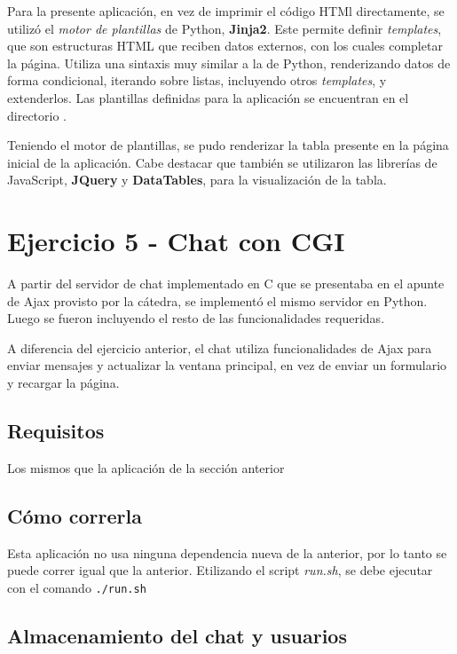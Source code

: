 Para la presente aplicación, en vez de imprimir el código HTMl directamente, se utilizó el \emph{motor de plantillas} de Python, \textbf{Jinja2}. Este permite definir \emph{templates}, que son estructuras HTML que reciben datos externos, con los cuales completar la página. Utiliza una sintaxis muy similar a la de Python, renderizando datos de forma condicional, iterando sobre listas, incluyendo otros \emph{templates}, y extenderlos. Las plantillas definidas para la aplicación se encuentran en el directorio .

Teniendo el motor de plantillas, se pudo renderizar la tabla presente en la página inicial de la aplicación. Cabe destacar que también se utilizaron las librerías de JavaScript, \textbf{JQuery} y \textbf{DataTables}, para la visualización de la tabla.  

\section{Ejercicio 5 - Chat con CGI}

A partir del servidor de chat implementado en C que se presentaba en el apunte de Ajax provisto por la cátedra, se implementó el mismo servidor en Python. Luego se fueron incluyendo el resto de las funcionalidades requeridas.

A diferencia del ejercicio anterior, el chat utiliza funcionalidades de Ajax para enviar mensajes y actualizar la ventana principal, en vez de enviar un formulario y recargar la página.

\subsection{Requisitos}

Los mismos que la aplicación de la sección anterior

\subsection{Cómo correrla}

Esta aplicación no usa ninguna dependencia nueva de la anterior, por lo tanto se puede correr igual que la anterior. Etilizando el script \emph{run.sh}, se debe ejecutar con el comando \texttt{./run.sh} 

\subsection{Almacenamiento del chat y usuarios}

